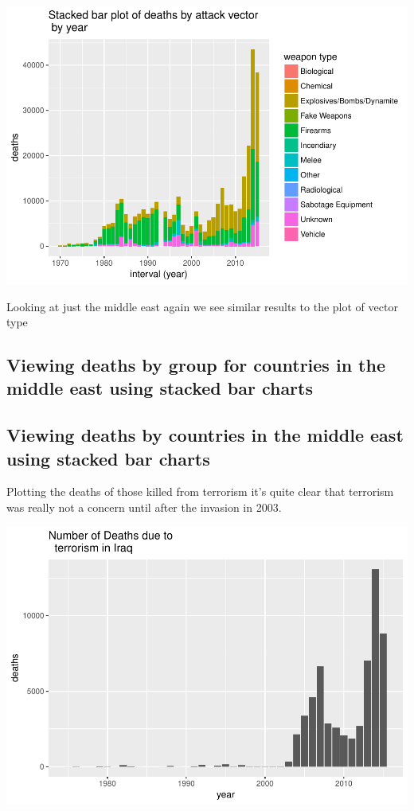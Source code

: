 \documentclass[]{article}
\begin{document}
\includegraphics{Peters_experiment_markdown_files/figure-latex/unnamed-chunk-9-1.pdf}

Looking at just the middle east again we see similar results to the plot
of vector type

\subsection{Viewing deaths by group for countries in the middle east
using stacked bar
charts}\label{viewing-deaths-by-group-for-countries-in-the-middle-east-using-stacked-bar-charts}

\subsection{Viewing deaths by countries in the middle east using stacked
bar
charts}\label{viewing-deaths-by-countries-in-the-middle-east-using-stacked-bar-charts}

Plotting the deaths of those killed from terrorism it's quite clear that
terrorism was really not a concern until after the invasion in 2003.

\includegraphics{Peters_experiment_markdown_files/figure-latex/unnamed-chunk-11-1.pdf}
\end{document}
